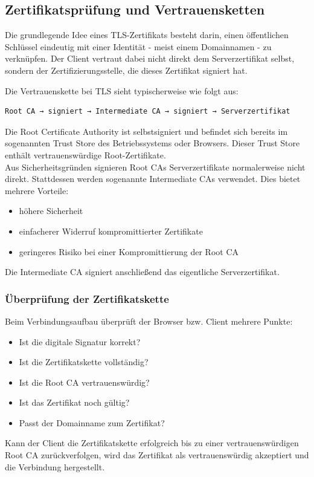 \subsection*{Zertifikatsprüfung und Vertrauensketten}
Die grundlegende Idee eines TLS-Zertifikats besteht darin, einen öffentlichen Schlüssel eindeutig mit einer Identität - meist einem Domainnamen - zu verknüpfen. Der Client vertraut dabei nicht direkt dem Serverzertifikat selbst, sondern der Zertifizierungsstelle, die dieses Zertifikat signiert hat.

Die Vertrauenskette bei TLS sieht typischerweise wie folgt aus:
\begin{lstlisting}
Root CA → signiert → Intermediate CA → signiert → Serverzertifikat
\end{lstlisting}
Die Root Certificate Authority ist selbstsigniert und befindet sich bereits im sogenannten Trust Store des Betriebssystems oder Browsers. Dieser Trust Store enthält vertrauenswürdige Root-Zertifikate. \\
Aus Sicherheitsgründen signieren Root CAs Serverzertifikate normalerweise nicht direkt. Stattdessen werden sogenannte Intermediate CAs verwendet. Dies bietet mehrere Vorteile:
\begin{itemize}
  \item höhere Sicherheit
  \item einfacherer Widerruf kompromittierter Zertifikate
  \item geringeres Risiko bei einer Kompromittierung der Root CA
\end{itemize}
Die Intermediate CA signiert anschließend das eigentliche Serverzertifikat.

\subsubsection*{Überprüfung der Zertifikatskette}
Beim Verbindungsaufbau überprüft der Browser bzw. Client mehrere Punkte:
\begin{itemize}
  \item Ist die digitale Signatur korrekt?
  \item Ist die Zertifikatskette vollständig?
  \item Ist die Root CA vertrauenswürdig?
  \item Ist das Zertifikat noch gültig?
  \item Passt der Domainname zum Zertifikat?
\end{itemize}
Kann der Client die Zertifikatskette erfolgreich bis zu einer vertrauenswürdigen Root CA zurückverfolgen, wird das Zertifikat als vertrauenswürdig akzeptiert und die Verbindung hergestellt.

